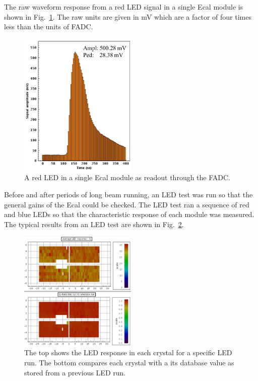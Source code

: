 The raw waveform response from a red LED signal in a single Ecal module is shown in Fig.~\ref{Figure:redSignal}. The raw units are given in mV which are a factor of four times less than the units of FADC.

\begin{figure}[H]
  \centering
      \includegraphics[width=0.5\textwidth]{pics/experiment/ledSignal.png}
  \caption[LED signal in Ecal FADC]{A red LED in a single Ecal module as readout through the FADC.}
  \label{Figure:redSignal}
\end{figure}

Before and after periods of long beam running, an LED test was run so that the general gains of the Ecal could be checked. The LED test ran a sequence of red and blue LEDs so that the characteristic response of each module was measured. The typical results from an LED test are shown in Fig.~\ref{Figure:redCompare}.

\begin{figure}[H]
  \centering
      \includegraphics[width=0.5\textwidth]{pics/experiment/ledCompare.png}
  \caption[Results of a single LED run]{The top shows the LED response in each crystal for a specific LED run. The bottom compares each crystal with a its database value as stored from a previous LED run.}
  \label{Figure:redCompare}
\end{figure}


